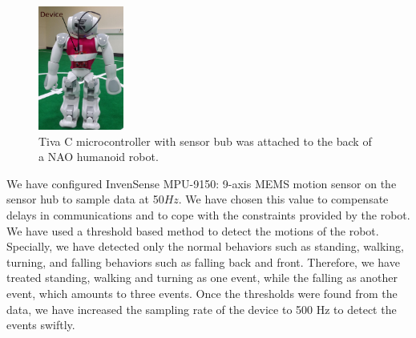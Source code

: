 \documentclass{llncs}
\begin{document}
\begin{sloppy}
\begin{figure}[!ht]
\centering
 \includegraphics[width=0.25\textwidth] {attached_device}
 \caption{Tiva C microcontroller with sensor bub was attached to the back of a NAO humanoid robot.}
 \label{fig:attached_device}
\end{figure}
\vspace{-5mm}
We have configured InvenSense MPU-9150: 9-axis MEMS motion sensor on the sensor hub to sample data
at 50$Hz$. We have chosen this value to compensate delays in communications and to cope with the
constraints provided by the robot. We have used a threshold based method to detect the motions of
the robot. Specially, we have detected only the normal behaviors such as standing, walking, turning,
and falling behaviors such as falling back and front. Therefore, we have treated standing, walking
and turning as one event, while the falling as another event, which amounts to three events. Once
the thresholds were found from the data, we have increased the sampling rate of the device to 500 Hz
to detect the events swiftly.  


\end{sloppy}
\end{document}
